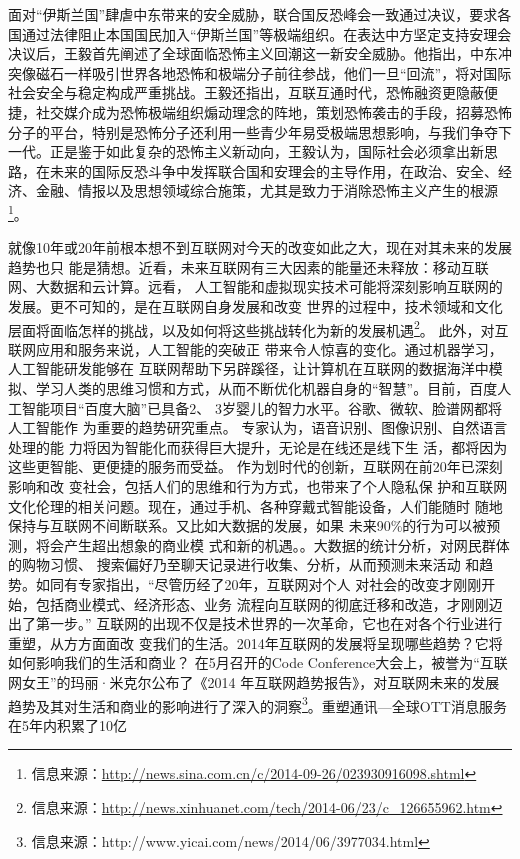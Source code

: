 面对“伊斯兰国”肆虐中东带来的安全威胁，联合国反恐峰会一致通过决议，要求各国通过法律阻止本国国民加入“伊斯兰国”等极端组织。在表达中方坚定支持安理会决议后，王毅首先阐述了全球面临恐怖主义回潮这一新安全威胁。他指出，中东冲突像磁石一样吸引世界各地恐怖和极端分子前往参战，他们一旦“回流”，将对国际社会安全与稳定构成严重挑战。王毅还指出，互联互通时代，恐怖融资更隐蔽便捷，社交媒介成为恐怖极端组织煽动理念的阵地，策划恐怖袭击的手段，招募恐怖分子的平台，特别是恐怖分子还利用一些青少年易受极端思想影响，与我们争夺下一代。正是鉴于如此复杂的恐怖主义新动向，王毅认为，国际社会必须拿出新思路，在未来的国际反恐斗争中发挥联合国和安理会的主导作用，在政治、安全、经济、金融、情报以及思想领域综合施策，尤其是致力于消除恐怖主义产生的根源\footnote{信息来源：\url{http://news.sina.com.cn/c/2014-09-26/023930916098.shtml}}。

就像10年或20年前根本想不到互联网对今天的改变如此之大，现在对其未来的发展趋势也只
能是猜想。近看，未来互联网有三大因素的能量还未释放：移动互联网、大数据和云计算。远看， 人工智能和虚拟现实技术可能将深刻影响互联网的发展。更不可知的，是在互联网自身发展和改变 世界的过程中，技术领域和文化层面将面临怎样的挑战，以及如何将这些挑战转化为新的发展机遇\footnote{信息来源：\url{http://news.xinhuanet.com/tech/2014-06/23/c_126655962.htm}}。
此外，对互联网应用和服务来说，人工智能的突破正 带来令人惊喜的变化。通过机器学习，人工智能研发能够在 互联网帮助下另辟蹊径，让计算机在互联网的数据海洋中模 拟、学习人类的思维习惯和方式，从而不断优化机器自身的“智慧”。目前，百度人工智能项目“百度大脑”已具备2、 3岁婴儿的智力水平。谷歌、微软、脸谱网都将人工智能作 为重要的趋势研究重点。
专家认为，语音识别、图像识别、自然语言处理的能 力将因为智能化而获得巨大提升，无论是在线还是线下生 活，都将因为这些更智能、更便捷的服务而受益。
作为划时代的创新，互联网在前20年已深刻影响和改
变社会，包括人们的思维和行为方式，也带来了个人隐私保 护和互联网文化伦理的相关问题。现在，通过手机、各种穿戴式智能设备，人们能随时 随地保持与互联网不间断联系。又比如大数据的发展，如果 未来90\%的行为可以被预测，将会产生超出想象的商业模 式和新的机遇。。大数据的统计分析，对网民群体的购物习惯、 搜索偏好乃至聊天记录进行收集、分析，从而预测未来活动 和趋势。如同有专家指出，“尽管历经了20年，互联网对个人 对社会的改变才刚刚开始，包括商业模式、经济形态、业务 流程向互联网的彻底迁移和改造，才刚刚迈出了第一步。”
互联网的出现不仅是技术世界的一次革命，它也在对各个行业进行重塑，从方方面面改 变我们的生活。2014年互联网的发展将呈现哪些趋势？它将如何影响我们的生活和商业？ 在5月召开的Code Conference大会上，被誉为“互联网女王”的玛丽·米克尔公布了《2014 年互联网趋势报告》，对互联网未来的发展趋势及其对生活和商业的影响进行了深入的洞察\footnote{信息来源：http://www.yicai.com/news/2014/06/3977034.html}。重塑通讯—全球OTT消息服务在5年内积累了10亿
